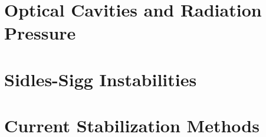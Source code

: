 \section{Optical Cavities and Radiation Pressure}

\section{Sidles-Sigg Instabilities}

\section{Current Stabilization Methods}

